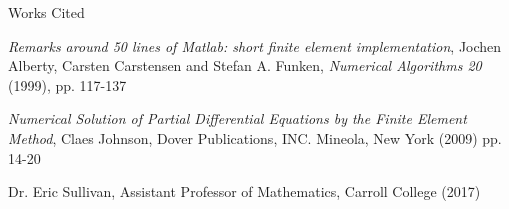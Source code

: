 \documentclass[10pt]{beamer}
\begin{document}
\begin{frame}{Works Cited}
\begin{thebibliography}{4}
\textit{Remarks around 50 lines of Matlab: short finite element implementation}, Jochen Alberty, Carsten Carstensen and Stefan A. Funken, \textit{Numerical Algorithms 20} (1999), pp. 117-137

\textit{Numerical Solution of Partial Differential Equations by the Finite Element Method}, Claes Johnson, Dover Publications, INC. Mineola, New York (2009) pp. 14-20



Dr. Eric Sullivan, Assistant Professor of Mathematics, Carroll College (2017)

\end{thebibliography}
\end{frame}
\end{document}
